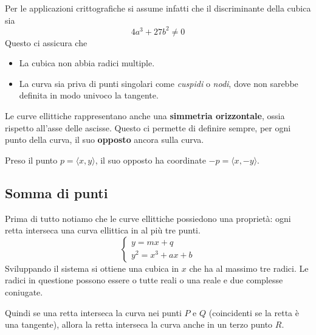 Per le applicazioni crittografiche si assume infatti che il discriminante della cubica sia
\[ 4 a^3 + 27 b^2 \neq 0 \]
Questo ci assicura che
\begin{itemize}
	\item La cubica non abbia radici multiple.
	\item La curva sia priva di punti singolari come \emph{cuspidi} o \emph{nodi}, dove non sarebbe definita in
	      modo univoco la tangente.
\end{itemize}
Le curve ellittiche rappresentano anche una \textbf{simmetria orizzontale}, ossia rispetto all'asse delle ascisse.
Questo ci permette di definire sempre, per ogni punto della curva, il suo \textbf{opposto} ancora sulla curva.

Preso il punto $p = \langle x, y \rangle$, il suo opposto ha coordinate $-p = \langle x, -y \rangle$.

\subsection{Somma di punti}
Prima di tutto notiamo che le curve ellittiche possiedono una propriet\`a: ogni retta interseca una curva ellittica
in al pi\`u tre punti.
\[
	\begin{cases}
		y = mx + q \\
		y^2 = x^3 + ax + b
	\end{cases}
\]
Sviluppando il sistema si ottiene una cubica in $x$ che ha al massimo tre radici. Le radici in questione possono
essere o tutte reali o una reale e due complesse coniugate.

Quindi se una retta interseca la curva nei punti $P$ e $Q$ (coincidenti se la retta \`e una tangente), allora la
retta interseca la curva anche in un terzo punto $R$.

